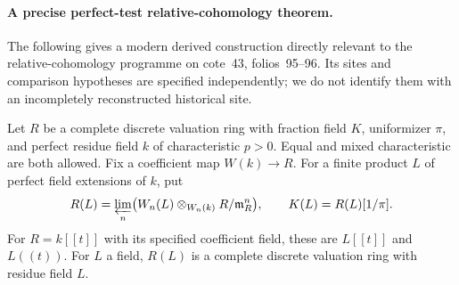 \paragraph{A precise perfect-test relative-cohomology theorem.}
The following gives a modern derived construction directly relevant to
the relative-cohomology programme on cote~43, folios~95--96.
Its sites and comparison hypotheses are specified independently; we
do not identify them with an incompletely reconstructed historical site.

\begin{theorem}\label{B:perfect-Greenberg-cohomology}
Let $R$ be a complete discrete valuation ring with fraction field $K$,
uniformizer $\pi$, and perfect residue field $k$ of characteristic $p>0$.
Equal and mixed characteristic are both allowed. Fix a coefficient map
$W(k)\to R$. For a finite product $L$ of perfect field extensions of $k$,
put
\[
 R(L)=\varprojlim_n
 \bigl(W_n(L)\otimes_{W_n(k)}R/\mathfrak m_R^n\bigr),
 \qquad K(L)=R(L)[1/\pi].
\]
For $R=k[[t]]$ with its specified coefficient field, these are $L[[t]]$
and $L((t))$. For $L$ a field, $R(L)$ is a complete discrete valuation
ring with residue field $L$.


\end{theorem}
